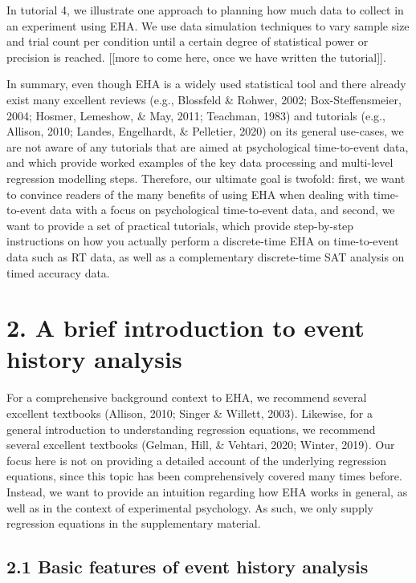 \documentclass[
  man, donotrepeattitle,floatsintext]{apa6}
\begin{document}
In tutorial 4, we illustrate one approach to planning how much data to collect in an experiment using EHA. We use data simulation techniques to vary sample size and trial count per condition until a certain degree of statistical power or precision is reached. {[}{[}more to come here, once we have written the tutorial{]}{]}.

In summary, even though EHA is a widely used statistical tool and there already exist many excellent reviews (e.g., Blossfeld \& Rohwer, 2002; Box-Steffensmeier, 2004; Hosmer, Lemeshow, \& May, 2011; Teachman, 1983) and tutorials (e.g., Allison, 2010; Landes, Engelhardt, \& Pelletier, 2020) on its general use-cases, we are not aware of any tutorials that are aimed at psychological time-to-event data, and which provide worked examples of the key data processing and multi-level regression modelling steps.
Therefore, our ultimate goal is twofold: first, we want to convince readers of the many benefits of using EHA when dealing with time-to-event data with a focus on psychological time-to-event data, and second, we want to provide a set of practical tutorials, which provide step-by-step instructions on how you actually perform a discrete-time EHA on time-to-event data such as RT data, as well as a complementary discrete-time SAT analysis on timed accuracy data.

\section{2. A brief introduction to event history analysis}\label{a-brief-introduction-to-event-history-analysis}

For a comprehensive background context to EHA, we recommend several excellent textbooks (Allison, 2010; Singer \& Willett, 2003). Likewise, for a general introduction to understanding regression equations, we recommend several excellent textbooks (Gelman, Hill, \& Vehtari, 2020; Winter, 2019). Our focus here is not on providing a detailed account of the underlying regression equations, since this topic has been comprehensively covered many times before. Instead, we want to provide an intuition regarding how EHA works in general, as well as in the context of experimental psychology. As such, we only supply regression equations in the supplementary material.

\subsection{2.1 Basic features of event history analysis}\label{basic-features-of-event-history-analysis}
\end{document}
